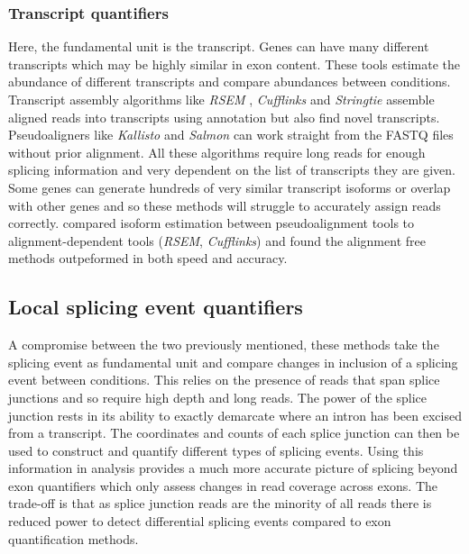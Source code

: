 \subsubsection{Transcript quantifiers}

Here, the fundamental unit is the transcript. Genes can have many different transcripts which may be highly similar in exon content.
These tools estimate the abundance of different transcripts and compare abundances between conditions.
Transcript assembly algorithms like \textit{RSEM} \citep{Li2011}, \textit{Cufflinks} \citep{Trapnell2010} and \textit{Stringtie} \citep{Pertea2015} assemble aligned reads into transcripts using annotation but also find novel transcripts.
Pseudoaligners like \textit{Kallisto} \citep{Bray2016} and \textit{Salmon} \citep{Patro2017} can work straight from the FASTQ files without prior alignment.  
All these algorithms require long reads for enough splicing information and very dependent on the list of transcripts they are given. 
Some genes can generate hundreds of very similar transcript isoforms or overlap with other genes and so these methods will struggle to accurately assign reads correctly.
\citep{Zhang2017} compared isoform estimation between pseudoalignment tools to alignment-dependent tools (\textit{RSEM}, \textit{Cufflinks}) and found the alignment free methods outpeformed in both speed and accuracy.


\subsection{Local splicing event quantifiers}

A compromise between the two previously mentioned, these methods take the splicing event as fundamental unit and compare changes in inclusion of a splicing event between conditions. 
This relies on the presence of reads that span splice junctions and so require high depth and long reads.
The power of the splice junction rests in its ability to exactly demarcate where an intron has been excised from a transcript. 
The coordinates and counts of each splice junction can then be used to construct and quantify different types of splicing events.
Using this information in analysis provides a much more accurate picture of splicing beyond exon quantifiers which only assess changes in read coverage across exons.
The trade-off is that as splice junction reads are the minority of all reads there is reduced power to detect differential splicing events compared to exon quantification methods.

